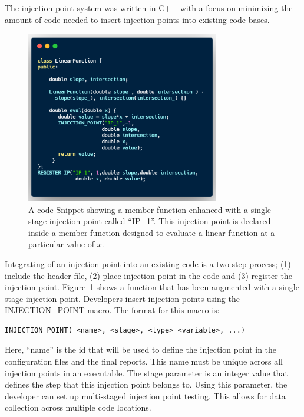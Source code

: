 The injection point system was written in C++ with a focus on minimizing the amount of 
code needed to insert injection points into existing code bases. 

\begin{figure}
\centering
 \includegraphics[width=0.75\textwidth]{./narrative/figures/linear-func.png}
 \caption{A code Snippet showing a member function enhanced with a single stage injection point called ``IP\_1''. This injection point is declared inside a member function 
 designed to evaluate a linear function at a particular value of $x$. \label{fig:example}}
\end{figure}

Integrating of an injection point into an existing code is a two step process; (1) include the header file, (2) place injection point in the code and (3) register the injection point. Figure~\ref{fig:example} shows a function that has been augmented with a single stage injection point. Developers insert injection points using the INJECTION\_POINT macro. The format for this macro is:

\begin{verbatim} 
INJECTION_POINT( <name>, <stage>, <type> <variable>, ...)
\end{verbatim}

Here, ``name'' is the id that will be used to define the injection point in the configuration files and the final reports. This name must be unique across all injection points in an executable. The stage parameter is an integer value that defines the step that this injection point belongs to. Using this parameter, the developer can set up multi-staged injection point testing. This allows for data collection across multiple code locations. 

